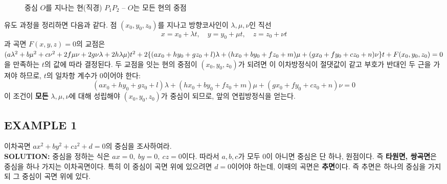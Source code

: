 \documentclass{article}
\theoremstyle{mystyle}
\begin{document}
\begin{figure}[h]
\centering
{}
\caption{중심 $O$를 지나는 현(직경) $P_1P_2$ -- $O$는 모든 현의 중점}
\end{figure}

유도 과정을 정리하면 다음과 같다. 점 \((x_0,y_0,z_0)\)를 지나고 방향코사인이 \(\lambda,\mu,\nu\)인 직선
\[
x=x_0+\lambda t,\quad y=y_0+\mu t,\quad z=z_0+\nu t
\]
과 곡면 \(F(x,y,z)=0\)의 교점은 \\
$(a\lambda^2+b\mu^2+c\nu^2+2f\mu\nu+2g\nu\lambda+2h\lambda\mu)t^2 \\
+2\{(ax_0+hy_0+gz_0+l)\lambda+(hx_0+by_0+fz_0+m)\mu+(gx_0+fy_0+cz_0+n)\nu\}t \\
+F(x_0,y_0,z_0)=0$ \\
을 만족하는 \(t\)의 값에 따라 결정된다. 두 교점을 잇는 현의 중점이 \((x_0,y_0,z_0)\)가 되려면 이 이차방정식이 절댓값이 같고 부호가 반대인 두 근을 가져야 하므로, \(t\)의 일차항 계수가 0이어야 한다:
\[
(ax_0+hy_0+gz_0+l)\lambda+(hx_0+by_0+fz_0+m)\mu+(gx_0+fy_0+cz_0+n)\nu=0
\]
이 조건이 \textbf{모든} \(\lambda,\mu,\nu\)에 대해 성립해야 \((x_0,y_0,z_0)\)가 중심이 되므로, 앞의 연립방정식을 얻는다.

\subsection*{EXAMPLE 1}
이차곡면 \(ax^2+by^2+cz^2+d=0\)의 중심을 조사하여라.\\
\textbf{SOLUTION:} 중심을 정하는 식은 \(ax=0,\ by=0,\ cz=0\)이다. 따라서 \(a,b,c\)가 모두 0이 아니면 중심은 단 하나, 원점이다. 즉 \textbf{타원면, 쌍곡면}은 중심을 하나 가지는 이차곡면이다. 특히 이 중심이 곡면 위에 있으려면 \(d=0\)이어야 하는데, 이때의 곡면은 \textbf{추면}이다. 즉 추면은 하나의 중심을 가지되 그 중심이 곡면 위에 있다.
\end{document}
